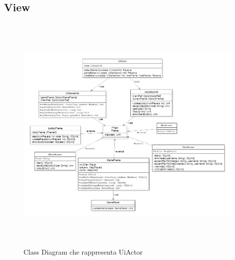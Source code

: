 \newpage
\subsection{View}

\begin{figure}[ht]
\centering
\includegraphics[width=13cm, height=12cm]{doc/report/img/Class-diagram-View.jpeg}
\caption{Class Diagram che rappresenta UiActor}
\label{fig:ClasDiagRaprUiAct}
\end{figure}

